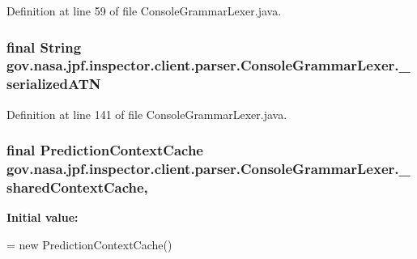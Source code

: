 Definition at line 59 of file Console\+Grammar\+Lexer.\+java.

\subsubsection[{\texorpdfstring{\+\_\+serialized\+A\+TN}{_serializedATN}}]{\setlength{\rightskip}{0pt plus 5cm}final String gov.\+nasa.\+jpf.\+inspector.\+client.\+parser.\+Console\+Grammar\+Lexer.\+\_\+serialized\+A\+TN\hspace{0.3cm}{\ttfamily [static]}}\hypertarget{classgov_1_1nasa_1_1jpf_1_1inspector_1_1client_1_1parser_1_1_console_grammar_lexer_ac2e2a7afc4d13c41b53ceddf4661e2c9}{}\label{classgov_1_1nasa_1_1jpf_1_1inspector_1_1client_1_1parser_1_1_console_grammar_lexer_ac2e2a7afc4d13c41b53ceddf4661e2c9}


Definition at line 141 of file Console\+Grammar\+Lexer.\+java.

\subsubsection[{\texorpdfstring{\+\_\+shared\+Context\+Cache}{_sharedContextCache}}]{\setlength{\rightskip}{0pt plus 5cm}final Prediction\+Context\+Cache gov.\+nasa.\+jpf.\+inspector.\+client.\+parser.\+Console\+Grammar\+Lexer.\+\_\+shared\+Context\+Cache\hspace{0.3cm}{\ttfamily [static]}, {\ttfamily [protected]}}\hypertarget{classgov_1_1nasa_1_1jpf_1_1inspector_1_1client_1_1parser_1_1_console_grammar_lexer_a6bfe1dd9808cbc1bf541cc960e4452f7}{}\label{classgov_1_1nasa_1_1jpf_1_1inspector_1_1client_1_1parser_1_1_console_grammar_lexer_a6bfe1dd9808cbc1bf541cc960e4452f7}
{\bfseries Initial value\+:}
\begin{DoxyCode}
=
    \textcolor{keyword}{new} PredictionContextCache()
\end{DoxyCode}


